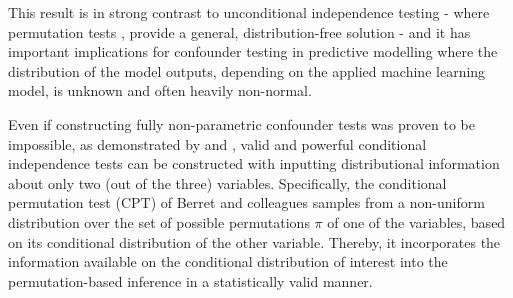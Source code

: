 \documentclass{article}
\begin{document}
This result is in strong contrast to unconditional independence testing - where permutation tests  \citep{pitman1937significance, fisher1942189}, provide a general, distribution-free solution - and it has important implications for confounder testing in predictive modelling where the distribution of the model outputs, depending on the applied machine learning model, is unknown and often heavily non-normal.

Even if constructing fully non-parametric confounder tests was proven to be impossible, as demonstrated by \citep{candes2016panning} and \cite{berrett2020conditional}, valid and powerful conditional independence tests can be constructed with inputting distributional information about only two (out of the three) variables.
Specifically, the conditional permutation test (CPT) of Berret and colleagues samples from a non-uniform distribution over the set of possible permutations $\pi$ of one of the variables, based on its conditional distribution of the other variable. Thereby, it incorporates the information available on the conditional distribution of interest into the permutation-based inference in a statistically valid manner.
\end{document}
